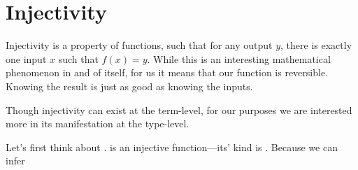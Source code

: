 \documentclass[book.tex]{subfiles}
\begin{document}
\chapter{Injectivity}

Injectivity is a property of functions, such that for any output $y$, there is
exactly one input $x$ such that $f(x) = y$. While this is an interesting
mathematical phenomenon in and of itself, for us it means that our function is
reversible. Knowing the result is just as good as knowing the inputs.

Though injectivity can exist at the term-level, for our purposes we are
interested more in its manifestation at the type-level.

Let's first think about .  is an injective function---its'
kind is . Because we can infer 
\end{document}

